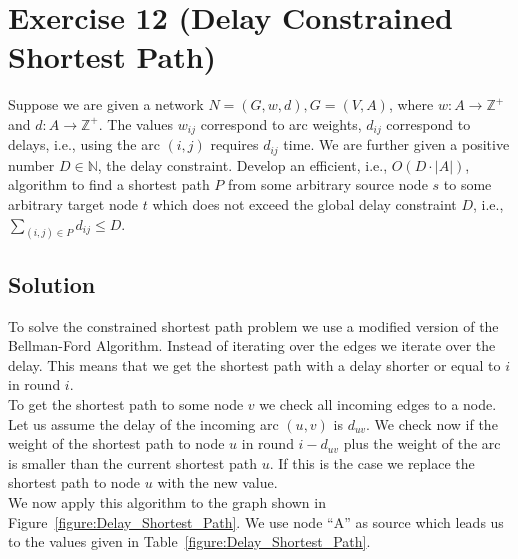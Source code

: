 \documentclass[a4paper, 12pt]{report}
\begin{document}
\section{Exercise 12 (Delay Constrained Shortest Path)}

Suppose we are given a network $N=(G,w,d), G=(V,A)$, where $w:A→ℤ^+$ and
$d:A→ℤ^+$. The values $w_{ij}$ correspond to arc weights, $d_{ij}$ correspond
to delays, i.e., using the arc $(i,j)$ requires $d_{ij}$ time. We are further
given a positive number $D ∈ ℕ$, the delay constraint. Develop an
efficient, i.e., $O(D · |A|)$, algorithm to find a shortest path $P$ from some
arbitrary source node $s$ to some arbitrary target node $t$ which does not
exceed the global delay constraint $D$, i.e., $∑_{(i,j) ∈ P} d_{ij} ≤ D$.

\subsection{Solution}

To solve the constrained shortest path problem we use a modified version of the
Bellman-Ford Algorithm. Instead of iterating over the edges we iterate over the
delay. This means that we get the shortest path with a delay shorter or equal
to $i$ in round $i$.\\

To get the shortest path to some node $v$ we check all incoming edges to a
node. Let us assume the delay of the incoming arc $(u,v)$ is $d_{uv}$. We check
now if the weight of the shortest path to node $u$ in round $i-d_{uv}$ plus the
weight of the arc is smaller than the current shortest path $u$. If this is the
case we replace the shortest path to node $u$ with the new value.\\

We now apply this algorithm to the graph shown in
Figure~\ref{figure:Delay_Shortest_Path}. We use node “A” as source which leads
us to the values given in Table~\ref{figure:Delay_Shortest_Path}.\\
\end{document}
